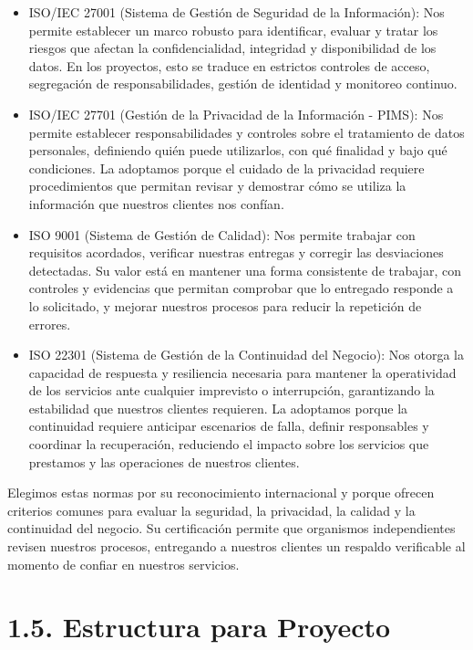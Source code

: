 \documentclass[11pt]{article}
\providecommand{\tightlist}{%
  \setlength{\itemsep}{0pt}\setlength{\parskip}{0pt}}
\begin{document}
\begin{itemize}
\tightlist
\item
  ISO/IEC 27001 (Sistema de Gestión de Seguridad de la Información): Nos permite establecer un marco robusto para identificar, evaluar y tratar los riesgos que afectan la confidencialidad, integridad y disponibilidad de los datos. En los proyectos, esto se traduce en estrictos controles de acceso, segregación de responsabilidades, gestión de identidad y monitoreo continuo.
\item
  ISO/IEC 27701 (Gestión de la Privacidad de la Información - PIMS): Nos permite establecer responsabilidades y controles sobre el tratamiento de datos personales, definiendo quién puede utilizarlos, con qué finalidad y bajo qué condiciones. La adoptamos porque el cuidado de la privacidad requiere procedimientos que permitan revisar y demostrar cómo se utiliza la información que nuestros clientes nos confían.
\item
  ISO 9001 (Sistema de Gestión de Calidad): Nos permite trabajar con requisitos acordados, verificar nuestras entregas y corregir las desviaciones detectadas. Su valor está en mantener una forma consistente de trabajar, con controles y evidencias que permitan comprobar que lo entregado responde a lo solicitado, y mejorar nuestros procesos para reducir la repetición de errores.
\item
  ISO 22301 (Sistema de Gestión de la Continuidad del Negocio): Nos otorga la capacidad de respuesta y resiliencia necesaria para mantener la operatividad de los servicios ante cualquier imprevisto o interrupción, garantizando la estabilidad que nuestros clientes requieren. La adoptamos porque la continuidad requiere anticipar escenarios de falla, definir responsables y coordinar la recuperación, reduciendo el impacto sobre los servicios que prestamos y las operaciones de nuestros clientes.
\end{itemize}

Elegimos estas normas por su reconocimiento internacional y porque ofrecen criterios comunes para evaluar la seguridad, la privacidad, la calidad y la continuidad del negocio. Su certificación permite que organismos independientes revisen nuestros procesos, entregando a nuestros clientes un respaldo verificable al momento de confiar en nuestros servicios.

\section{1.5. Estructura para Proyecto}\label{estructura-para-proyecto}
\end{document}
